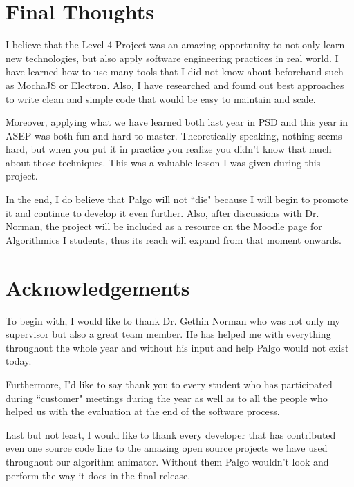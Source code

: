 \documentclass{l4proj}
\begin{document}
\section{Final Thoughts}

I believe that the Level 4 Project was an amazing opportunity to not only learn new technologies, but also apply
software engineering practices in real
world. I have learned how to use many tools that I did not know about beforehand such as MochaJS or Electron. Also, I
have researched and found out best approaches to write clean and simple code that would be easy to maintain and scale. 

Moreover, applying what we have learned both last year in PSD and this year in ASEP was both fun and hard to master.
Theoretically speaking, nothing seems hard, but when you put it in practice you realize you didn't know that much about
those techniques. This was a valuable lesson I was given during this project.

In the end, I do believe that Palgo will not ``die" because I will begin to promote it and continue to develop it even
further. Also, after discussions with Dr. Norman, the project will be included as a resource on the Moodle page for
Algorithmics I students, thus its reach will expand from that moment onwards.

\section{Acknowledgements}

To begin with, I would like to thank Dr. Gethin Norman who was not only my supervisor but also a great team member. He
has helped me with everything throughout the whole year and without his input and help Palgo would not exist today.

Furthermore, I'd like to say thank you to every student who has participated during ``customer" meetings during the year
as well as to all the people who helped us with the evaluation at the end of the software process.

Last but not least, I would like to thank every developer that has contributed even one source code line to the amazing open source projects
we have used throughout our algorithm animator. Without them Palgo wouldn't look and perform the way it does in
the final release.


\appendix



\end{document}
